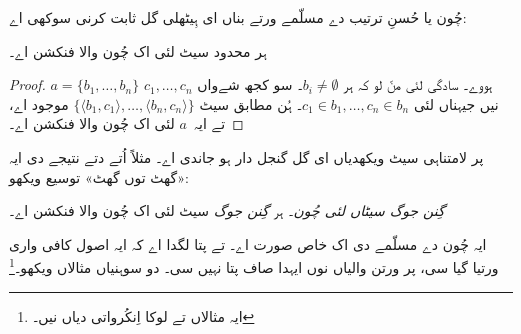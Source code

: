 \documentclass[../../../include/open-logic-section]{subfiles}
\begin{document}

چُون یا حُسنِ ترتیب دے مسلّمے ورتے بناں ای ہِیٹھلی گل ثابت کرنی سوکھی اے:

\begin{lem}[$\Zminus$ وچ]
ہر محدود سیٹ لئی اک چُون والا فنکشن اے۔
\end{lem}

\begin{proof}
$a = \{b_1, \ldots, b_n\}$ ہووے۔ سادگی لئی منّ لو کہ ہر $b_i
\neq \emptyset$۔ سو کجھ شےواں $c_1, \ldots, c_n$ نیں جیہناں لئی
$c_1 \in b_1, \ldots, c_n \in b_n$۔ ہُن  مطابق سیٹ $\{\langle b_1,
c_1\rangle , \ldots, \langle b_n, c_n\rangle\}$ موجود اے، تے ایہ~$a$ لئی اک چُون والا فنکشن اے۔
\end{proof}

پر لامتناہی سیٹ ویکھدیاں ای گل گنجل دار ہو جاندی اے۔ مثلاً اُتے دتے نتیجے دی ایہ «گھٹ توں گھٹ» توسیع ویکھو:

\begin{defish}
\emph{گِنن جوگ سیٹاں لئی چُون۔} ہر \emph{گِنن جوگ} سیٹ لئی اک چُون والا فنکشن اے۔
\end{defish}

ایہ چُون دے مسلّمے دی اک خاص صورت اے۔ تے پتا لگدا اے کہ ایہ اصول کافی واری ورتیا گیا سی، پر ورتن والیاں نوں ایہدا صاف پتا نہیں سی۔ دو سوہنیاں مثالاں ویکھو۔\footnote{ایہ مثالاں \citet[\S9.4]{Potter2004} تے لوکا اِنکُرواتی دیاں نیں۔}
\end{document}
